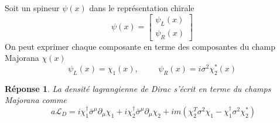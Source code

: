 \documentclass{article}
\numberwithin{equation}{section}
\theoremstyle{solution}
\newtheorem{solution}{Réponse}[section]
\begin{document}
\subsection{}
Soit un spineur $\psi(x)$ dans le représentation chirale
\begin{equation}
        \psi(x) = 
        \begin{bmatrix}
                \psi_L(x) \\
                \psi_R(x)
        \end{bmatrix}
\end{equation} 
On peut exprimer chaque composante en terme des composantes du champ Majorana $\chi(x)$
\begin{equation}\label{eq:dirac_m_rep}
        \psi_L(x) = \chi_1(x), \hspace{1cm} \psi_R(x) = i \sigma^{2}\chi_2^{*}(x)
\end{equation} 
\begin{solution}
        La densité lagrangienne de Dirac s'écrit en terme du champs Majorana comme
        \begin{equation}\;a
                \mathcal{L}_D =  i \chi_1^{\dagger} \bar{\sigma}^{\mu} \partial_\mu \chi_1 + i\chi_2^{\dagger} \bar{\sigma}^{\mu} \partial_\mu \chi_2 + 
                im(\chi_2^{T} \sigma^{2} \chi_1 - \chi_1^{\dagger} \sigma^{2}\chi_2^{*})
        \end{equation} 
\end{solution}
\end{document}
